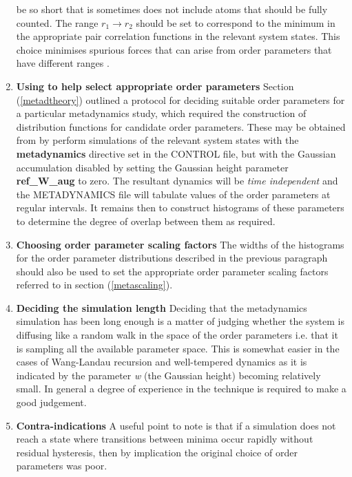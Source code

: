 \begin{enumerate}
  be so short that is sometimes does not include atoms that should be fully
  counted. The range $r_{1}\rightarrow r_{2}$ should be set to correspond 
  to the minimum in the appropriate pair correlation functions in the relevant
  system states. This choice minimises spurious forces that can arise from
  order parameters that have different ranges \cite{quigley-09a}.
\item {\bf Using \D{} to help select appropriate order parameters}\newline
  Section (\ref{metadtheory}) outlined a protocol for deciding suitable order
  parameters for a particular metadynamics study, which required the
  construction of distribution functions for candidate order parameters. These
  may be obtained from \D{} by perform simulations of the relevant system
  states with the {\bf metadynamics} directive set in the CONTROL file, but
  with the Gaussian accumulation disabled by setting the Gaussian height
  parameter {\bf ref\_W\_aug} to zero. The resultant dynamics
  will be {\em time independent} and the METADYNAMICS file will tabulate
  values of the order parameters at regular intervals. It remains then to
  construct histograms of these parameters to determine the degree of overlap
  between them as required.
\item {\bf Choosing order parameter scaling factors}\newline
  The widths of the histograms for the order parameter distributions
  described in the previous paragraph should also be used to set the 
  appropriate order parameter scaling factors referred to in section 
  (\ref{metascaling}).
\item {\bf Deciding the simulation length}\newline
  Deciding that the metadynamics simulation has been long enough
  is a matter of judging whether the system is diffusing like a random walk in
  the space of the order parameters i.e. that it is sampling all the
  available parameter space. This is somewhat easier in the cases of
  Wang-Landau recursion and well-tempered dynamics as it is indicated by the
  parameter {\em w} (the Gaussian height) becoming relatively small. In
  general a degree of experience in the technique is required to make a good
  judgement. 
\item {\bf Contra-indications}\newline
  A useful point to note is that if a simulation does not reach a state
  where transitions between minima occur rapidly without residual hysteresis,
  then by implication the original choice of order parameters was poor.
\end{enumerate}

